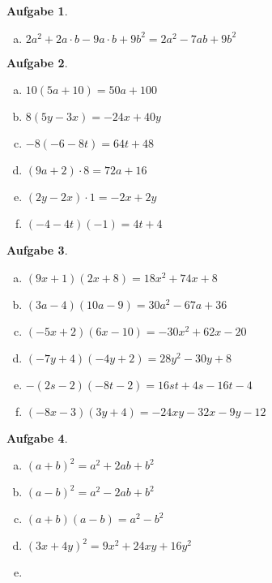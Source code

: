 \documentclass[12pt,fleqn]{article}
\theoremstyle{aufg}
\newtheorem{aufgabe}{Aufgabe}
\theoremstyle{bsp}
\begin{document}
\begin{flushleft}
\begin{aufgabe}
\begin{multicols}{2}
\begin{enumerate}[a)]
\item 
$2a^2+2a\cdot b-9a\cdot b+9b^2=2 a^{2} - 7 a b + 9 b^{2}$
\end{enumerate} 
\end{multicols} 
\end{aufgabe} 
\begin{aufgabe} ~ \\ 
\begin{multicols}{3} 
\begin{enumerate}[a)] 
\item 
$10(5a+10)=50 a + 100$
\item 
$8(5y-3x)=- 24 x + 40 y$
\item 
$-8(-6-8t)=64 t + 48$
\item 
$(9a+2)\cdot 8=72 a + 16$
\item 
$(2y-2x)\cdot 1=- 2 x + 2 y$
\item 
$(-4-4t)(-1)=4 t + 4$
\end{enumerate} 
\end{multicols} 
\end{aufgabe} 
\begin{aufgabe} ~ \\ 
\begin{multicols}{3} 
\begin{enumerate}[a)] 
\item 
$(9x+1)(2x+8)=18 x^{2} + 74 x + 8$
\item 
$(3a-4)(10a-9)=30 a^{2} - 67 a + 36$
\item 
$(-5x+2)(6x-10)=- 30 x^{2} + 62 x - 20$
\item 
$(-7y+4)(-4y+2)=28 y^{2} - 30 y + 8$
\item 
$-(2s-2)(-8t-2)=16 s t + 4 s - 16 t - 4$
\item 
$(-8x-3)(3y+4)=- 24 x y - 32 x - 9 y - 12$
\end{enumerate} 
\end{multicols} 
\end{aufgabe} 
\begin{aufgabe} ~ \\ 
\begin{multicols}{3} 
\begin{enumerate}[a)] 
\item 
$(a+b)^2=a^{2} + 2 a b + b^{2}$
\item 
$(a-b)^2=a^{2} - 2 a b + b^{2}$
\item 
$(a+b)(a-b)=a^{2} - b^{2}$
\item 
$(3x+4y)^2=9 x^{2} + 24 x y + 16 y^{2}$
\item 

\end{enumerate}
\end{multicols}
\end{aufgabe}
\end{flushleft}
\end{document}
